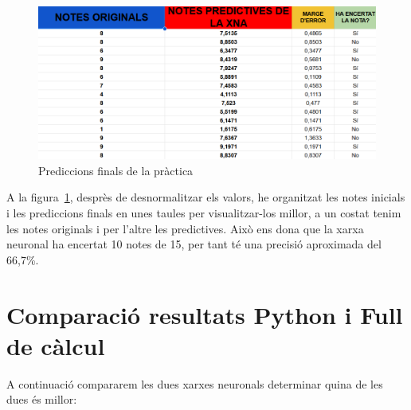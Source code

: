 \vspace*{1truecm}
\begin{figure}[h]
    \centering
    \includegraphics[width=1\textwidth]{./figures/Resultat_final.png}
    \caption{Prediccions finals de la pràctica}
    \label{f:resulat_full}
\end{figure}

\vspace*{1truecm}
A la figura~\ref{f:resulat_full}, desprès de desnormalitzar els valors, he organitzat les notes inicials i les prediccions finals en unes taules per visualitzar-los millor, a un costat tenim les notes originals i per l'altre les predictives.
Això ens dona que la xarxa neuronal ha encertat 10 notes de 15, per tant té una precisió aproximada del 66,7\%.

\clearpage
\section{Comparació resultats Python i Full de càlcul}

A continuació compararem les dues xarxes neuronals determinar quina de les dues és millor:

